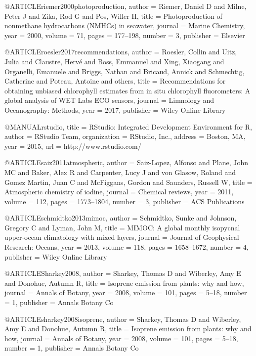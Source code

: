 @ARTICLE{riemer2000photoproduction,
  author = {Riemer, Daniel D and Milne, Peter J and Zika, Rod G and Pos, Willer
	H},
  title = {Photoproduction of nonmethane hydrocarbons (NMHCs) in seawater},
  journal = {Marine Chemistry},
  year = {2000},
  volume = {71},
  pages = {177--198},
  number = {3},
  publisher = {Elsevier}
}

@ARTICLE{roesler2017recommendations,
  author = {Roesler, Collin and Uitz, Julia and Claustre, Herv{\'e} and Boss,
	Emmanuel and Xing, Xiaogang and Organelli, Emanuele and Briggs, Nathan
	and Bricaud, Annick and Schmechtig, Catherine and Poteau, Antoine
	and others},
  title = {Recommendations for obtaining unbiased chlorophyll estimates from
	in situ chlorophyll fluorometers: A global analysis of WET Labs ECO
	sensors},
  journal = {Limnology and Oceanography: Methods},
  year = {2017},
  publisher = {Wiley Online Library}
}

@MANUAL{rstudio,
  title = {RStudio: Integrated Development Environment for R},
  author = {{RStudio Team}},
  organization = {RStudio, Inc.},
  address = {Boston, MA},
  year = {2015},
  url = {http://www.rstudio.com/}
}

@ARTICLE{saiz2011atmospheric,
  author = {Saiz-Lopez, Alfonso and Plane, John MC and Baker, Alex R and Carpenter,
	Lucy J and von Glasow, Roland and Gomez Martin, Juan C and McFiggans,
	Gordon and Saunders, Russell W},
  title = {Atmospheric chemistry of iodine},
  journal = {Chemical reviews},
  year = {2011},
  volume = {112},
  pages = {1773--1804},
  number = {3},
  publisher = {ACS Publications}
}

@ARTICLE{schmidtko2013mimoc,
  author = {Schmidtko, Sunke and Johnson, Gregory C and Lyman, John M},
  title = {MIMOC: A global monthly isopycnal upper-ocean climatology with mixed
	layers},
  journal = {Journal of Geophysical Research: Oceans},
  year = {2013},
  volume = {118},
  pages = {1658--1672},
  number = {4},
  publisher = {Wiley Online Library}
}

@ARTICLE{Sharkey2008,
  author = {Sharkey, Thomas D and Wiberley, Amy E and Donohue, Autumn R},
  title = {Isoprene emission from plants: why and how},
  journal = {Annals of Botany},
  year = {2008},
  volume = {101},
  pages = {5--18},
  number = {1},
  publisher = {Annals Botany Co}
}

@ARTICLE{sharkey2008isoprene,
  author = {Sharkey, Thomas D and Wiberley, Amy E and Donohue, Autumn R},
  title = {Isoprene emission from plants: why and how},
  journal = {Annals of Botany},
  year = {2008},
  volume = {101},
  pages = {5--18},
  number = {1},
  publisher = {Annals Botany Co}
}

